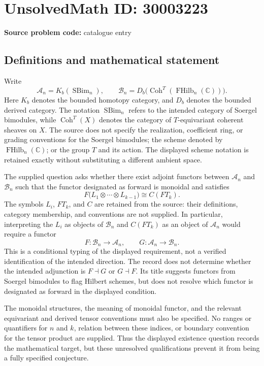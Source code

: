\documentclass[11pt]{article}
\newcommand{\C}{\mathbb{C}}
\begin{document}
\section*{UnsolvedMath ID: 30003223}
\textbf{Source problem code:} catalogue entry
\subsection{Definitions and mathematical statement}
Write
\[
\mathcal A_n=K_b(\operatorname{SBim}_n),\qquad
\mathcal B_n=D_b\bigl(\operatorname{Coh}^T(\operatorname{FHilb}_n(\C))\bigr).
\]
Here \(K_b\) denotes the bounded homotopy category, and \(D_b\) denotes the bounded derived category. The notation \(\operatorname{SBim}_n\) refers to the intended category of Soergel bimodules, while \(\operatorname{Coh}^T(X)\) denotes the category of \(T\)-equivariant coherent sheaves on \(X\). The source does not specify the realization, coefficient ring, or grading conventions for the Soergel bimodules; the scheme denoted by \(\operatorname{FHilb}_n(\C)\); or the group \(T\) and its action. The displayed scheme notation is retained exactly without substituting a different ambient space.

The supplied question asks whether there exist adjoint functors between \(\mathcal A_n\) and \(\mathcal B_n\) such that the functor designated as forward is monoidal and satisfies
\[
F\bigl(L_1\otimes\cdots\otimes L_{k-1}\bigr)
\cong C(FT_k).
\]
The symbols \(L_i\), \(FT_k\), and \(C\) are retained from the source: their definitions, category membership, and conventions are not supplied. In particular, interpreting the \(L_i\) as objects of \(\mathcal B_n\) and \(C(FT_k)\) as an object of \(\mathcal A_n\) would require a functor
\[
F:\mathcal B_n\longrightarrow\mathcal A_n,
\qquad
G:\mathcal A_n\longrightarrow\mathcal B_n.
\]
This is a conditional typing of the displayed requirement, not a verified identification of the intended direction. The record does not determine whether the intended adjunction is \(F\dashv G\) or \(G\dashv F\). Its title suggests functors from Soergel bimodules to flag Hilbert schemes, but does not resolve which functor is designated as forward in the displayed condition.

The monoidal structures, the meaning of monoidal functor, and the relevant equivariant and derived tensor conventions must also be specified. No ranges or quantifiers for \(n\) and \(k\), relation between these indices, or boundary convention for the tensor product are supplied. Thus the displayed existence question records the mathematical target, but these unresolved qualifications prevent it from being a fully specified conjecture.
\end{document}
